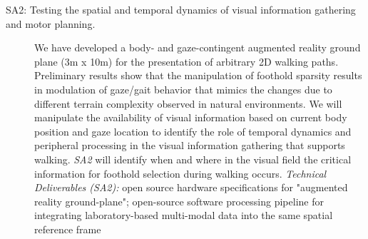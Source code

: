 \begin{description}
    \item[SA2: Testing the spatial and temporal dynamics of visual information gathering and motor planning.] {We have developed a body- and gaze-contingent augmented reality ground plane (3m x 10m) for the presentation of arbitrary 2D walking paths. Preliminary results show that the manipulation of foothold sparsity results in modulation of gaze/gait behavior that mimics the changes due to different terrain complexity observed in natural environments. We will manipulate the availability of visual information based on current body position and gaze location to identify the role of temporal dynamics and peripheral processing in the visual information gathering that supports walking.  \textit{SA2} will identify when and where in the visual field the critical information for foothold selection during walking occurs. \textit{Technical Deliverables (SA2):} open source hardware specifications for "augmented reality ground-plane"; open-source software processing pipeline for integrating laboratory-based multi-modal data into the same spatial reference frame}





\end{description}
